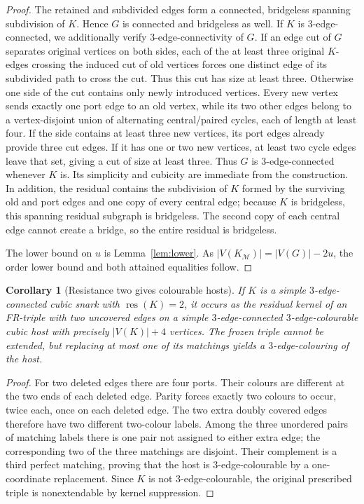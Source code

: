 \documentclass[11pt]{article}
\newtheorem{corollary}{Corollary}
\newcommand{\rc}{\operatorname{res}}
\begin{document}
\begin{proof}
The retained and subdivided edges form a connected, bridgeless spanning subdivision of $K$. Hence $G$ is connected and bridgeless as well. If $K$ is $3$-edge-connected, we additionally verify $3$-edge-connectivity of $G$. If an edge cut of $G$ separates original vertices on both sides, each of the at least three original $K$-edges crossing the induced cut of old vertices forces one distinct edge of its subdivided path to cross the cut. Thus this cut has size at least three. Otherwise one side of the cut contains only newly introduced vertices. Every new vertex sends exactly one port edge to an old vertex, while its two other edges belong to a vertex-disjoint union of alternating central/paired cycles, each of length at least four. If the side contains at least three new vertices, its port edges already provide three cut edges. If it has one or two new vertices, at least two cycle edges leave that set, giving a cut of size at least three. Thus $G$ is $3$-edge-connected whenever $K$ is. Its simplicity and cubicity are immediate from the construction. In addition, the residual contains the subdivision of $K$ formed by the surviving old and port edges and one copy of every central edge; because $K$ is bridgeless, this spanning residual subgraph is bridgeless. The second copy of each central edge cannot create a bridge, so the entire residual is bridgeless.

The lower bound on $u$ is Lemma~\ref{lem:lower}. As $|V(K_{\mathcal M})|=|V(G)|-2u$, the order lower bound and both attained equalities follow.
\end{proof}

\begin{corollary}[Resistance two gives colourable hosts]\label{cor:two}
If $K$ is a simple $3$-edge-connected cubic snark with $\rc(K)=2$, it occurs as the residual kernel of an FR-triple with two uncovered edges on a simple $3$-edge-connected \emph{$3$-edge-colourable} cubic host with precisely $|V(K)|+4$ vertices. The frozen triple cannot be extended, but replacing at most one of its matchings yields a $3$-edge-colouring of the host.
\end{corollary}
\begin{proof}
For two deleted edges there are four ports. Their colours are different at the two ends of each deleted edge. Parity forces exactly two colours to occur, twice each, once on each deleted edge. The two extra doubly covered edges therefore have two different two-colour labels. Among the three unordered pairs of matching labels there is one pair not assigned to either extra edge; the corresponding two of the three matchings are disjoint. Their complement is a third perfect matching, proving that the host is $3$-edge-colourable by a one-coordinate replacement. Since $K$ is not $3$-edge-colourable, the original prescribed triple is nonextendable by kernel suppression.
\end{proof}
\end{document}
